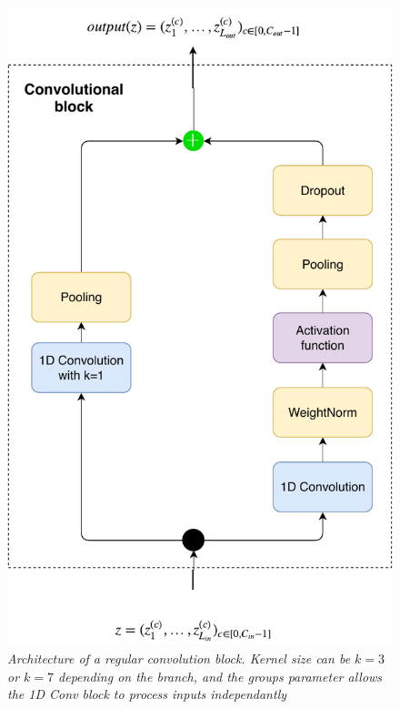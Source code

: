\documentclass{article}
\begin{document}
\begin{figure}
    \centering
    \includegraphics[scale=0.5]{img/residual_block.pdf}
    \caption{\textit{Architecture of a regular convolution block. Kernel size can be $k=3$ or $k=7$ depending on the branch, and the \emph{groups} parameter allows the 1D Conv block to process inputs independantly}}
    \label{fig:regular-conv-block-architecture}
\end{figure}
\end{document}
